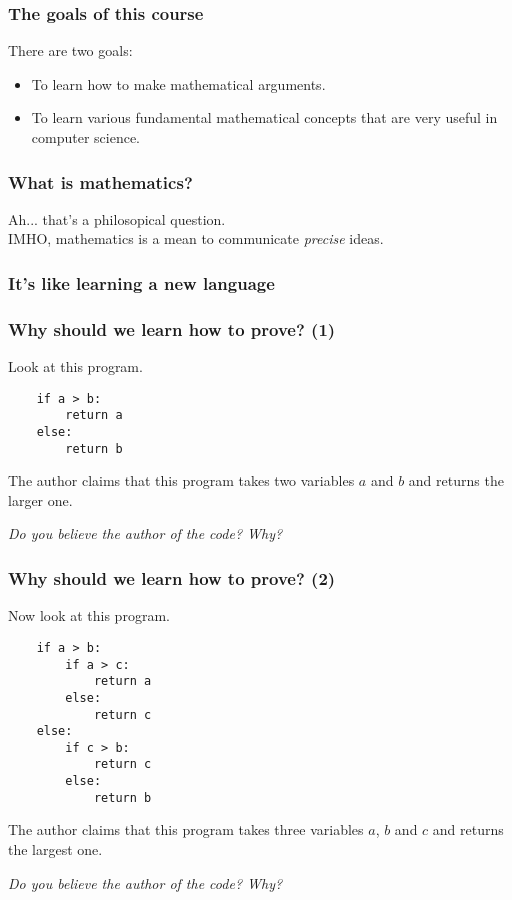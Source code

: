 \documentclass{beamer}
\begin{document}


\begin{frame}\frametitle{The goals of this course}
  There are two goals:
  \begin{itemize}
  \item To learn how to make mathematical arguments.
    \pause
  \item To learn various fundamental mathematical concepts that are
    very useful in computer science.
  \end{itemize}
\end{frame}

\begin{frame}\frametitle{What is mathematics?}
  \pause
  Ah... that's a philosopical question. \\
  \pause
  IMHO, mathematics is a mean to communicate {\em precise} ideas.
\end{frame}

\begin{frame}\frametitle{It's like learning a new language}
\end{frame}


\begin{frame}[fragile]\frametitle{Why should we learn how to prove? (1)}
  \pause
  Look at this program.

\begin{verbatim}
    if a > b:
        return a
    else:
        return b
\end{verbatim}

  The author claims that this program takes two variables $a$ and $b$
  and returns the larger one.
  \pause
  
  {\em Do you believe the author of the code? \pause Why?}
\end{frame}

\begin{frame}[fragile]\frametitle{Why should we learn how to prove? (2)}
  Now look at this program.

  {\small
\begin{verbatim}
    if a > b:
        if a > c:
            return a
        else:
            return c
    else:
        if c > b:
            return c
        else:
            return b
\end{verbatim}
  }
  
  The author claims that this program takes three variables $a$, $b$
  and $c$ and returns the largest one.  \pause
  
  {\em Do you believe the author of the code? \pause Why?}
\end{frame}
\end{document}
